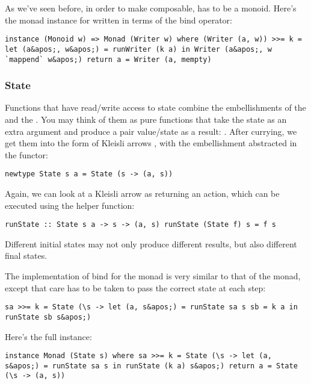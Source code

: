 As we've seen before, in order to make  composable,
 has to be a monoid. Here's the monad instance for
 written in terms of the bind operator:

\begin{verbatim}
instance (Monoid w) => Monad (Writer w) where (Writer (a, w)) >>= k = let (a&apos;, w&apos;) = runWriter (k a) in Writer (a&apos;, w `mappend` w&apos;) return a = Writer (a, mempty)
\end{verbatim}

\subsubsection{State}\label{state}

Functions that have read/write access to state combine the
embellishments of the  and the . You may
think of them as pure functions that take the state as an extra argument
and produce a pair value/state as a result:
. After currying, we get them
into the form of Kleisli arrows
, with the
embellishment abstracted in the  functor:

\begin{verbatim}
newtype State s a = State (s -> (a, s))
\end{verbatim}

Again, we can look at a Kleisli arrow as returning an action, which can
be executed using the helper function:

\begin{verbatim}
runState :: State s a -> s -> (a, s) runState (State f) s = f s
\end{verbatim}

Different initial states may not only produce different results, but
also different final states.

The implementation of bind for the  monad is very similar
to that of the  monad, except that care has to be taken
to pass the correct state at each step:

\begin{verbatim}
sa >>= k = State (\s -> let (a, s&apos;) = runState sa s sb = k a in runState sb s&apos;)
\end{verbatim}

Here's the full instance:

\begin{verbatim}
instance Monad (State s) where sa >>= k = State (\s -> let (a, s&apos;) = runState sa s in runState (k a) s&apos;) return a = State (\s -> (a, s))
\end{verbatim}

